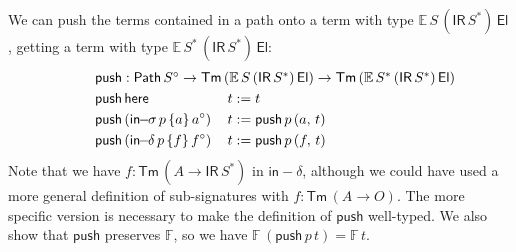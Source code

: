 \documentclass[acmsmall,screen,review]{acmart}
\newcommand{\msf}[1]{{\mathsf{#1}}}
\newcommand{\mbb}[1]{\mathbb{#1}}
\newcommand{\push}{\mathsf{push}}
\newcommand{\El}{\msf{El}}
\newcommand{\IR}{\msf{IR}}
\newcommand{\Tm}{\msf{Tm}}
\newcommand{\w}{\circ}
\newcommand{\Path}{\msf{Path}}
\newcommand{\here}{\msf{here}}
\newcommand{\insigma}{\msf{in}\!\!-\!\!\sigma}
\newcommand{\indelta}{\msf{in}\!\!-\!\!\delta}
\newcommand{\E}{\mbb{E}}
\newcommand{\F}{\mbb{F}}
\begin{document}
\begin{definition}
We can push the terms contained in a path onto a term with type $\E\,S\,(\IR\,S^*)\,\El$, getting a
term with type $\E\,S^*\,(\IR\,S^*)\,\El$:
\begin{alignat*}{4}
  & \hspace{-6em}\rlap{$\push : \Path\,S^\w \to \Tm\,(\E\,S\,(\IR\,S^*)\,\El) \to \Tm\,(\E\,S^*\,(\IR\,S^*)\,\El)$}\\
  & \hspace{-6em}\push\,\here\,                     &&t := t\\
  & \hspace{-6em}\push\,(\insigma\,p\,\{a\}\,a^\w)\,&&t := \push\,p\,(a,\,t)\\
  & \hspace{-6em}\push\,(\indelta\,p\,\{f\}\,f^\w)\,&&t := \push\,p\,(f,\,t)
\end{alignat*}
Note that we have $f : \Tm\,(A \to \IR\,S^*)$ in $\indelta$, although we could have used a more
general definition of sub-signatures with $f : \Tm\,(A \to O)$. The more specific version is
necessary to make the definition of $\push$ well-typed. We also show that $\push$ preserves $\F$, so
we have $\F\,(\push\,p\,t) = \F\,t$.

\end{definition}
\end{document}
